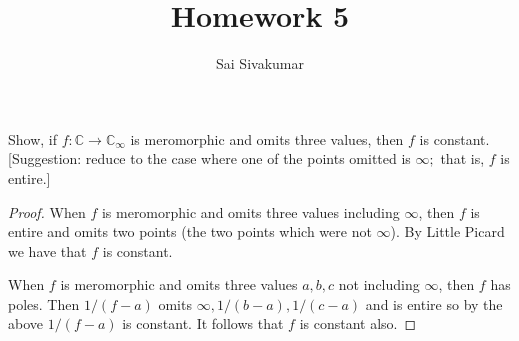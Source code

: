 \documentclass[12pt]{amsart}
\title{Homework 5}
\author{Sai Sivakumar}
\newcommand{\CC}{\mathbb{C}}
\begin{document}
\maketitle

\thispagestyle{empty}

Show, if $f:\CC \to \CC_\infty$ is meromorphic and omits three values, then $f$ is constant. [Suggestion: reduce to the case where one of the points omitted is $\infty;$ that is, $f$ is entire.]

 \bigskip

\begin{proof}
\baselineskip=24pt
When $f$ is meromorphic and omits three values including $\infty$, then $f$ is entire and omits two points (the two points which were not $\infty$). By Little Picard we have that $f$ is constant. 

When $f$ is meromorphic and omits three values $a,b,c$ not including $\infty$, then $f$ has poles. Then $1/(f-a)$ omits $\infty,1/(b-a),1/(c-a)$ and is entire so by the above $1/(f-a)$ is constant. It follows that $f$ is constant also.
\end{proof}
\end{document}
